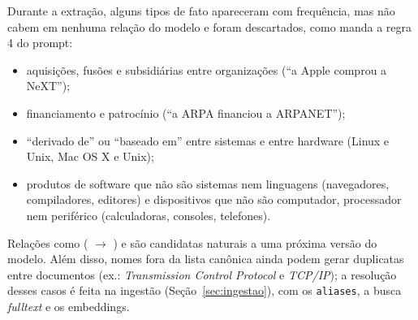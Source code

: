 Durante a extração, alguns tipos de fato apareceram com frequência, mas não cabem em nenhuma relação do modelo e foram descartados, como manda a regra 4 do prompt:
\begin{itemize}
  \item aquisições, fusões e subsidiárias entre organizações (``a Apple comprou a NeXT'');
  \item financiamento e patrocínio (``a ARPA financiou a ARPANET'');
  \item ``derivado de'' ou ``baseado em'' entre sistemas e entre hardware (Linux e Unix, Mac OS X e Unix);
  \item produtos de software que não são sistemas nem linguagens (navegadores, compiladores, editores) e dispositivos que não são computador, processador nem periférico (calculadoras, consoles, telefones).
\end{itemize}
Relações como  ( $\rightarrow$ ) e  são candidatas naturais a uma próxima versão do modelo. Além disso, nomes fora da lista canônica ainda podem gerar duplicatas entre documentos (ex.: \emph{Transmission Control Protocol} e \emph{TCP/IP}); a resolução desses casos é feita na ingestão (Seção~\ref{sec:ingestao}), com os \texttt{aliases}, a busca \emph{fulltext} e os embeddings.
